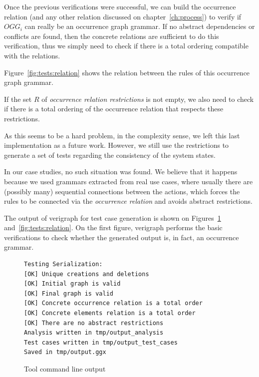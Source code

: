 Once the previous verifications were successful, we can build the occurrence relation (and any other relation discussed on chapter~\ref{ch:process}) to verify if $OGG_i$ can really be an occurrence graph grammar. If no abstract dependencies or conflicts are found, then the concrete relations are sufficient to do this verification, thus we simply need to check if there is a total ordering compatible with the relations.

\begin{example} Figure~\ref{fig:tests:relation} shows the relation between the rules of this occurrence graph grammar.
\end{example}

If the set $R$ of \emph{occurrence relation restrictions} is not empty, we also need to check if there is a total ordering of the occurrence relation that respects these restrictions.

As this seems to be a hard problem, in the complexity sense, we left this last implementation as a future work. However, we still use the restrictions to generate a set of tests regarding the consistency of the system states.

In our case studies, no such situation was found. We believe that it happens because we used grammars extracted from real use cases, where usually there are (possibly many) sequential connections between the actions, which forces the rules to be connected via the \emph{occurrence relation} and avoids abstract restrictions.

The output of verigraph for test case generation is shown on Figures~\ref{fig:tests:checklist} and~\ref{fig:tests:relation}. On the first figure, verigraph performs the basic verifications to check whether the generated output is, in fact, an occurrence grammar.

\begin{figure}[!ht]
\caption{Tool command line output}
\begin{verbatim}
Testing Serialization:
[OK] Unique creations and deletions
[OK] Initial graph is valid
[OK] Final graph is valid
[OK] Concrete occurrence relation is a total order
[OK] Concrete elements relation is a total order
[OK] There are no abstract restrictions
Analysis written in tmp/output_analysis
Test cases written in tmp/output_test_cases
Saved in tmp/output.ggx
\end{verbatim}
  \label{fig:tests:checklist}
\end{figure}

